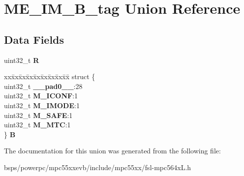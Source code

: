 \hypertarget{unionME__IM__32B__tag}{}\section{M\+E\+\_\+\+I\+M\+\_\+B\+\_\+tag Union Reference}
\label{unionME__IM__32B__tag}
\subsection*{Data Fields}
\begin{DoxyCompactItemize}
\item 
\mbox{\label{unionME__IM__32B__tag_a4da8f8885579a1a4ad63bd868d636450}} 
uint32\+\_\+t {\bfseries R}
\item 
\mbox{\label{unionME__IM__32B__tag_ae2c316ee40a8750a9dae089258603b4a}} 
\begin{tabbing}
xx\=xx\=xx\=xx\=xx\=xx\=xx\=xx\=xx\=\kill
struct \{\\
\>uint32\_t {\bfseries \_\_pad0\_\_}:28\\
\>uint32\_t {\bfseries M\_ICONF}:1\\
\>uint32\_t {\bfseries M\_IMODE}:1\\
\>uint32\_t {\bfseries M\_SAFE}:1\\
\>uint32\_t {\bfseries M\_MTC}:1\\
\} {\bfseries B}\\

\end{tabbing}\end{DoxyCompactItemize}


The documentation for this union was generated from the following file\+:\begin{DoxyCompactItemize}
\item 
bsps/powerpc/mpc55xxevb/include/mpc55xx/fsl-\/mpc564x\+L.\+h\end{DoxyCompactItemize}
